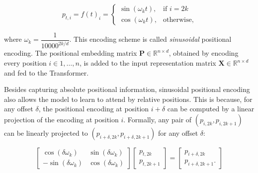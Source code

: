 \begin{equation}
    p_{t,i} = f(t)_i = 
\begin{cases}
    \sin(\omega_k t), & \text{if } i=2k\\
    \cos(\omega_k t),              & \text{otherwise},
\end{cases}
\end{equation}

\noindent where $\omega_k =\dfrac{1}{10000^{2k/d}}$. This encoding scheme is called \textit{sinusoidal} positional encoding. The positional embedding matrix $\bm{P} \in \mathbb{R}^{n \times d}$, obtained by encoding every position $i \in {1, \ldots, n}$, is added to the input representation matrix $\bm{X} \in \mathbb{R}^{n \times d}$ and fed to the Transformer.



Besides capturing absolute positional information, sinusoidal positional encoding also allows the model to learn to attend by relative positions. This is because, for any offset $\delta$, the positional encoding at position $i + \delta$ can be computed by a linear projection of the encoding at position $i$. Formally, any pair of $(p_{i, 2k}, p_{i, 2k+1})$ can be linearly projected to $(p_{i + \delta, 2k}, p_{i + \delta, 2k+1})$ for any offset $\delta$:

\begin{equation}
    \begin{bmatrix}
        \cos(\delta \omega_k)  & \sin(\delta \omega_k) \\
        -\sin(\delta \omega_k) & \cos(\delta \omega_k)
    \end{bmatrix}
    \begin{bmatrix}
        p_{t, 2k}   \\
        p_{t, 2k+1}
    \end{bmatrix}
    = \begin{bmatrix}
        p_{i + \delta, 2k}   \\
        p_{i + \delta, 2k+1}.
    \end{bmatrix}
\end{equation}

